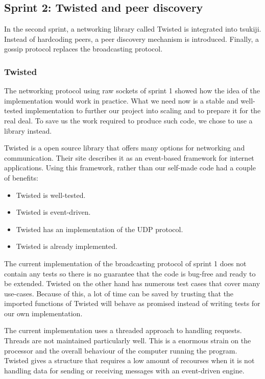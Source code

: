 \subsection{Sprint 2: Twisted and peer discovery}
In the second sprint, a networking library called Twisted is integrated into tsukiji. Instead of hardcoding peers, a peer discovery mechanism is introduced. Finally, a gossip protocol replaces the broadcasting protocol.

\subsubsection{Twisted}
\label{sprint2:twisted}
The networking protocol using raw sockets of sprint 1 showed how the idea of the implementation would work in practice.
What we need now is a stable and well-tested implementation to further our project into scaling and to prepare it for the real deal.
To save us the work required to produce such code, we chose to use a library instead.

Twisted is a open source library that offers many options for networking and communication. 
Their site describes it as an event-based framework for internet applications. Using this framework, rather than our self-made code had a couple of benefits:
\begin{itemize}
\item Twisted is well-tested.
\item Twisted is event-driven.
\item Twisted has an implementation of the UDP protocol.
\item Twisted is already implemented.
\end{itemize}
The current implementation of the broadcasting protocol of sprint 1 does not contain any tests so there is no guarantee that the code is bug-free and ready to be extended.
Twisted on the other hand has numerous test cases that cover many use-cases.
Because of this, a lot of time can be saved by trusting that the imported functions of Twisted will behave as promised instead of writing tests for our own implementation.

The current implementation uses a threaded approach to handling requests.
Threads are not maintained particularly well.
This is a enormous strain on the processor and the overall behaviour of the computer running the program.
Twisted gives a structure that requires a low amount of recourses when it is not handling data for sending or receiving messages with an event-driven engine.

